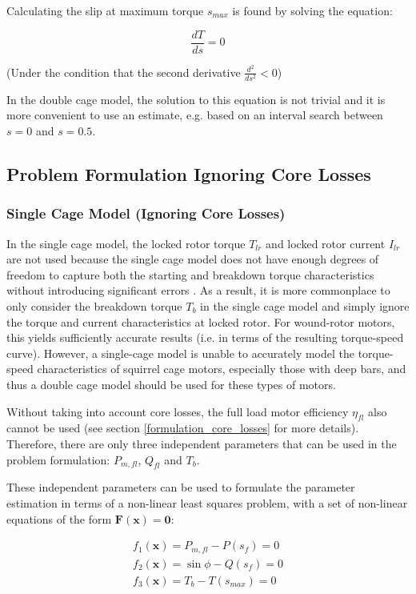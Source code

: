 \documentclass{article}
\begin{document}
Calculating the slip at maximum torque $s_{max}$ is found by solving the equation:

\begin{equation}
\frac{dT}{ds} = 0
\end{equation}

(Under the condition that the second derivative $\frac{d^{2}}{ds^{2}} < 0$) 

In the double cage model, the solution to this equation is not trivial and it is more convenient to use an estimate, e.g. based on an interval search between $s=0$ and $s=0.5$.

\subsection{Problem Formulation Ignoring Core Losses}
\label{sec:problem_formulation}

\subsubsection{Single Cage Model (Ignoring Core Losses)}
In the single cage model, the locked rotor torque $T_{lr}$ and locked rotor current $I_{lr}$ are not used because the single cage model does not have enough degrees of freedom to capture both the starting and breakdown torque characteristics without introducing significant errors \cite{pedra_2006}. As a result, it is more commonplace to only consider the breakdown torque $T_{b}$ in the single cage model and simply ignore the torque and current characteristics at locked rotor. For wound-rotor motors, this yields sufficiently accurate results (i.e. in terms of the resulting torque-speed curve). However, a single-cage model is unable to accurately model the torque-speed characteristics of squirrel cage motors, especially those with deep bars, and thus a double cage model should be used for these types of motors.

Without taking into account core losses, the full load motor efficiency $\eta_{fl}$ also cannot be used (see section \ref{formulation_core_losses} for more details). Therefore, there are only three independent parameters that can be used in the problem formulation: $P_{m,fl}$, $Q_{fl}$ and $T_{b}$.

These independent parameters can be used to formulate the parameter estimation in terms of a non-linear least squares problem, with a set of non-linear equations of the form $\mathbf{F}(\mathbf{x}) = \mathbf{0}$:

\begin{eqnarray}
f_{1} (\mathbf x) = P_{m,fl} - P(s_{f}) = 0 \\
f_{2} (\mathbf x) = \sin{\phi} - Q(s_{f})  = 0 \\
f_{3} (\mathbf x) = T_{b} - T(s_{max}) = 0 \\
\end{eqnarray}
\end{document}
